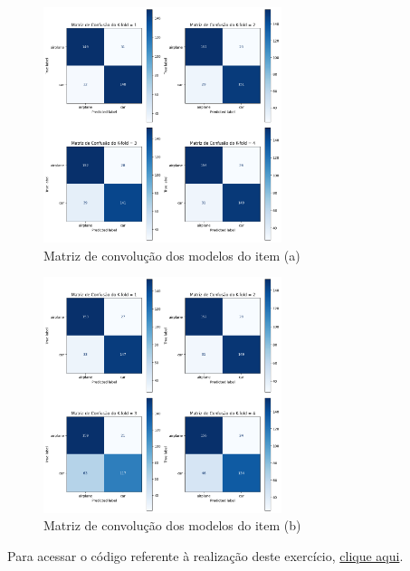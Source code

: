 \documentclass[]{abntex2}
\begin{document}
\begin{figure}[H]
    \centering 
    \includegraphics[width=0.62\textwidth]{imgs/ex1/conf_a.png}
    \caption{Matriz de convolução dos modelos do item (a)}
    \label{fig:1conf_a} %
\end{figure}

\begin{figure}[H]
    \centering 
    \includegraphics[width=0.62\textwidth]{imgs/ex1/conf_b.png}
    \caption{Matriz de convolução dos modelos do item (b)}
    \label{fig:1conf_b} %
\end{figure}

Para acessar o código referente à realização deste exercício, \href{https://github.com/lorran-araujo/LNCC/blob/main/disciplinas/redes-neurais/codes/lista3/exercicio1.ipynb}{clique aqui}.
\end{document}
